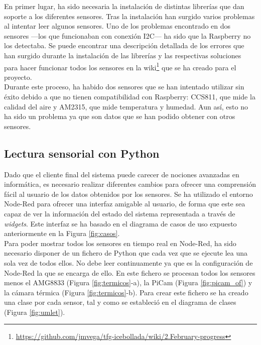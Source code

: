 En primer lugar, ha sido necesaria la instalación de distintas librerías que dan soporte a los diferentes sensores. Tras la instalación han surgido varios problemas al intentar leer algunos sensores. Uno de los problemas encontrado en dos sensores ---los que funcionaban con conexión I2C--- ha sido que la Raspberry no los detectaba. Se puede encontrar una descripción detallada de los errores que han surgido durante la instalación de las librerías y las respectivas soluciones para hacer funcionar todos los sensores en la wiki\footnote{\url{https://github.com/jmvega/tfg-icebollada/wiki/2.February-progress}} que se ha creado para el proyecto.\\

Durante este proceso, ha habido dos sensores que se han intentado utilizar sin éxito debido a que no tienen compatibilidad con Raspberry: CCS811, que mide la calidad del aire y AM2315, que mide temperatura y humedad. Aun así, esto no ha sido un problema ya que son datos que se han podido obtener con otros sensores.\\

\subsection{Lectura sensorial con Python}
\label{sec:ficheropython}
Dado que el cliente final del sistema puede carecer de nociones avanzadas en informática, es necesario realizar diferentes cambios para ofrecer una comprensión fácil al usuario de los datos obtenidos por los sensores. Se ha utilizado el entorno Node-Red para ofrecer una interfaz amigable al usuario, de forma que este sea capaz de ver la información del estado del sistema representada a través de \textit{widgets}. Este interfaz se ha basado en el diagrama de casos de uso expuesto anteriormente en la Figura \ref{fig:casos}.\\

Para poder mostrar todos los sensores en tiempo real en Node-Red, ha sido necesario disponer de un fichero de Python que cada vez que se ejecute lea una sola vez de todos ellos. No debe leer continuamente ya que es la configuración de Node-Red la que se encarga de ello. En este fichero se procesan todos los sensores menos el AMG8833 (Figura \ref{fig:termicos}-a), la PiCam (Figura \ref{fig:picam_of}) y la cámara térmica (Figura \ref{fig:termicos}-b). Para crear este fichero se ha creado una clase por cada sensor, tal y como se estableció en el diagrama de clases (Figura \ref{fig:umlet}).\\

